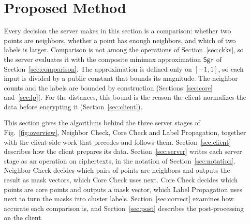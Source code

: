 \section{Proposed Method}
\label{sec:method}

Every decision the server makes in this section is a comparison: whether
two points are neighbors, whether a point has enough neighbors, and which
of two labels is larger. Comparison is not among the operations of
Section~\ref{sec:ckks}, so the server evaluates it with the composite
minimax approximation $\mathsf{Sgn}$ of Section~\ref{sec:comparison}. The
approximation is defined only on $[-1,1]$, so each input is divided by a
public constant that bounds its magnitude. The neighbor counts and the
labels are bounded by construction (Sections~\ref{sec:core}
and~\ref{sec:lp}). For the distances, this bound is the reason the client
normalizes the data before encrypting it (Section~\ref{sec:client}).

This section gives the algorithms behind the three server stages of
Fig.~\ref{fig:overview}, Neighbor Check, Core Check and Label
Propagation, together with the client-side work that precedes and
follows them. Section~\ref{sec:client} describes how the client prepares
its data. Section~\ref{sec:server} writes each server stage as an
operation on ciphertexts, in the notation of Section~\ref{sec:notation}.
Neighbor Check decides which pairs of points are neighbors and outputs
the result as mask vectors, which Core Check uses next. Core Check
decides which points are core points and outputs a mask vector, which
Label Propagation uses next to turn the masks into cluster labels.
Section~\ref{sec:correct} examines how
accurate each comparison is, and Section~\ref{sec:post} describes the
post-processing on the client.
